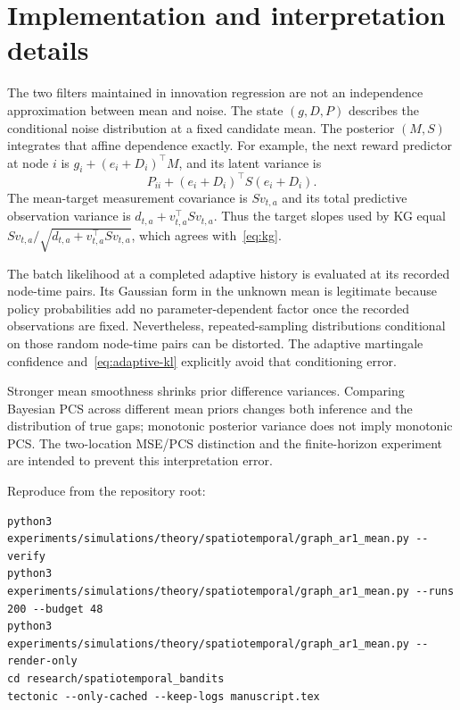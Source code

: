 \documentclass[11pt]{article}
\begin{document}
\appendix
\section{Implementation and interpretation details}
The two filters maintained in innovation regression are not an independence approximation between mean and noise. The state $(g,D,P)$ describes the conditional noise distribution at a fixed candidate mean. The posterior $(M,S)$ integrates that affine dependence exactly. For example, the next reward predictor at node $i$ is $g_i+(e_i+D_i)^\top M$, and its latent variance is
\[
P_{ii}+(e_i+D_i)^\top S(e_i+D_i).
\]
The mean-target measurement covariance is $Sv_{t,a}$ and its total predictive observation variance is $d_{t,a}+v_{t,a}^\top Sv_{t,a}$. Thus the target slopes used by KG equal $Sv_{t,a}/\sqrt{d_{t,a}+v_{t,a}^\top Sv_{t,a}}$, which agrees with~\eqref{eq:kg}.

The batch likelihood at a completed adaptive history is evaluated at its recorded node-time pairs. Its Gaussian form in the unknown mean is legitimate because policy probabilities add no parameter-dependent factor once the recorded observations are fixed. Nevertheless, repeated-sampling distributions conditional on those random node-time pairs can be distorted. The adaptive martingale confidence and~\eqref{eq:adaptive-kl} explicitly avoid that conditioning error.

Stronger mean smoothness shrinks prior difference variances. Comparing Bayesian PCS across different mean priors changes both inference and the distribution of true gaps; monotonic posterior variance does not imply monotonic PCS. The two-location MSE/PCS distinction and the finite-horizon experiment are intended to prevent this interpretation error.

Reproduce from the repository root:
\begin{verbatim}
python3 experiments/simulations/theory/spatiotemporal/graph_ar1_mean.py --verify
python3 experiments/simulations/theory/spatiotemporal/graph_ar1_mean.py --runs 200 --budget 48
python3 experiments/simulations/theory/spatiotemporal/graph_ar1_mean.py --render-only
cd research/spatiotemporal_bandits
tectonic --only-cached --keep-logs manuscript.tex
\end{verbatim}
\end{document}
